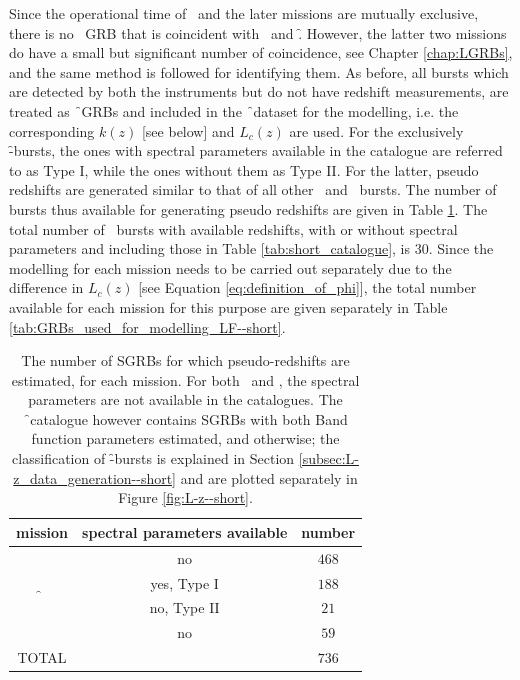Since the operational time of \B\ and the later missions are mutually exclusive, there is no \B\ GRB that is coincident with \s\ and \f. However, the latter two missions do have a small but significant number of coincidence, see Chapter \ref{chap:LGRBs}, and the same method is followed for identifying them. As before, all bursts which are detected by both the instruments but do not have redshift measurements, are treated as \f\ GRBs and included in the \f\ dataset for the modelling, i.e. the corresponding $k(z)$ [see below] and $L_c (z)$ are used. For the exclusively \f -bursts, the ones with spectral parameters available in the catalogue are referred to as Type I, while the ones without them as Type II. For the latter, pseudo redshifts are generated similar to that of all other \B\ and \s\ bursts. The number of bursts thus available for generating pseudo redshifts are given in Table \ref{tab:pseudo_numbers--short}. The total number of \s\ bursts with available redshifts, with or without spectral parameters and including those in Table \ref{tab:short_catalogue}, is $30$. Since the modelling for each mission needs to be carried out separately due to the difference in $L_c (z)$ [see Equation \ref{eq:definition_of_phi}], the total number available for each mission for this purpose are given separately in Table \ref{tab:GRBs_used_for_modelling_LF--short}.

\begin{table}
\caption[Categories of short GRBs with pseudo redshift]{The number of SGRBs for which pseudo-redshifts are estimated, for each mission. For both \B\ and \s, the spectral parameters are not available in the catalogues. The \f\ catalogue however contains SGRBs with both Band function parameters estimated, and otherwise; the classification of \f -bursts is explained in Section \ref{subsec:L-z_data_generation--short} and are plotted separately in Figure \ref{fig:L-z--short}.}
\label{tab:pseudo_numbers--short}
\begin{center}
\begin{tabular}{|c|c|c|}
\hline 
mission & spectral parameters available & number \\
\hline 
\hline 
\B &  no & $468$ \\
\hline 
\multirow{2}{*}{\f} & yes, Type I & $188$ \\
\cline{2-3} 
 & no, Type II & $21$ \\
\hline 
\s &  no & $59$ \\
\hline
\hline
TOTAL & & $736$ \\
\hline
\end{tabular}
\end{center}
\end{table}

